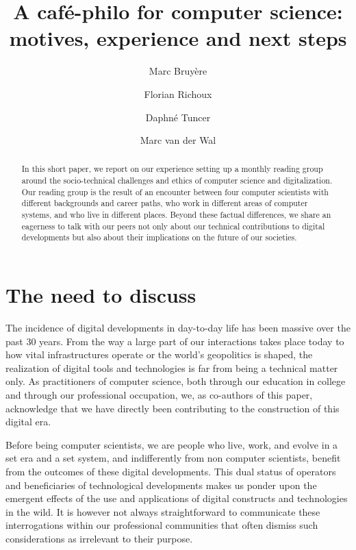 \documentclass[journal]{IEEEtran}
\title{A café-philo for computer science:\\motives, experience and next steps}
\date{}
\author[1,3]{Marc Bruyère\equalcontribmark}
\author[2,3]{Florian Richoux\equalcontribmark}
\author[4]{Daphné Tuncer\equalcontribmark}
\author[5]{Marc van der Wal\equalcontribmark}
\affil[   ]{\it   marc@iij.ad.jp    \quad   florian@richoux.fr   \quad
  daphne.tuncer@enpc.fr \quad marc.vanderwal@afnic.fr}
\affil[1]{IIJ Research Lab, Japan}
\affil[2]{AIST, Japan}
\affil[3]{JFLI, CNRS, Japan}
\affil[4]{École des Ponts ParisTech, France}
\affil[5]{Afnic, France}
\newcommand{\equalcontribmark}{*}
\begin{document}
\maketitle
\begingroup\renewcommand\thefootnote{\equalcontribmark}
\endgroup

\begin{abstract}
  In  this short  paper,  we report  on our  experience  setting up  a
  monthly  reading group  around  the  socio-technical challenges  and
  ethics of computer science and  digitalization. Our reading group is
  the result  of an  encounter between  four computer  scientists with
  different backgrounds and career paths,  who work in different areas
  of computer systems, and who  live in different places. Beyond these
  factual differences,  we share an  eagerness to talk with  our peers
  not only  about our technical contributions  to digital developments
  but also about their implications on the future of our societies.
\end{abstract}

\section{The need to discuss}

The  incidence of  digital developments  in day-to-day  life has  been
massive over  the past  30 years.  From the  way a  large part  of our
interactions  takes  place  today  to how vital  infrastructures
operate or the  world’s geopolitics is shaped, the realization
of digital tools and technologies is far from being a technical matter
only. As practitioners of computer science, both through our education
in college and through our  professional occupation, we, as co-authors
of this paper, acknowledge that  we have directly been contributing to
the construction of this digital era.

Before being computer scientists, we are people who live, work, and evolve in
a set era and a set system, and indifferently from non computer scientists,
benefit from the outcomes of these digital developments. This dual status of
operators and beneficiaries of technological developments makes us ponder upon
the emergent effects of the use and applications of digital constructs and
technologies in the wild. It is however not always straightforward to
communicate these interrogations within our professional communities that
often dismiss such considerations as irrelevant to their purpose.
\end{document}
